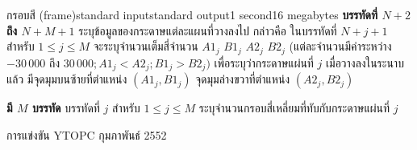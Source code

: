 \documentclass[11pt,a4paper]{article}
\begin{document}
\begin{problem}{กรอบสี (frame)}{standard input}{standard output}{1 second}{16 megabytes}
\newpage
\textbf{บรรทัดที่ $N+2$ ถึง $N+M+1$} ระบุข้อมูลของกระดาษแต่ละแผนที่วางลงไป กล่าวคือ ในบรรทัดที่ $N + j+1$ สำหรับ $1 \leq j \leq M$ จะระบุจำนวนเต็มสี่จำนวน $A1_j$ $B1_j$ $A2_j$ $B2_j$ (แต่ละจำนวนมีค่าระหว่าง $-30\,000$ ถึง $30\,000; A1_j < A2_j ; B1_j > B2_j)$ เพื่อระบุว่ากระดาษแผ่นที่ $j$ เมื่อวางลงในระนาบแล้ว มีจุดมุมบนซ้ายที่ตำแหน่ง $(A1_j, B1_j)$ จุดมุมล่างขวาที่ตำแหน่ง $(A2_j, B2_j)$

\OutputFile

\textbf{มี $M$ บรรทัด} บรรทัดที่ $j$ สำหรับ $1 \leq j \leq M$ ระบุจำนวนกรอบสี่เหลี่ยมที่ทับกับกระดาษแผ่นที่ $j$

\Examples

\begin{example}
%
\end{example}

\Source

การแข่งขัน YTOPC กุมภาพันธ์ 2552

\end{problem}
\end{document}
